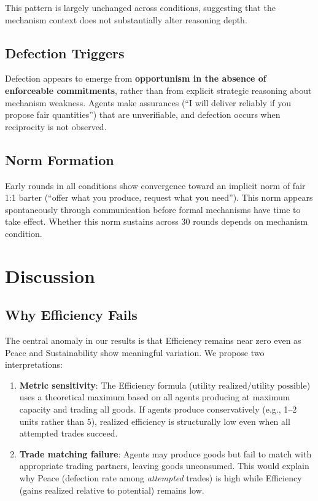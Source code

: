 \documentclass[12pt, a4paper]{article}
\begin{document}
This pattern is largely unchanged across conditions, suggesting that the mechanism context does not substantially alter reasoning depth.

\subsection{Defection Triggers}

Defection appears to emerge from \textbf{opportunism in the absence of enforceable commitments}, rather than from explicit strategic reasoning about mechanism weakness. Agents make assurances (``I will deliver reliably if you propose fair quantities'') that are unverifiable, and defection occurs when reciprocity is not observed.

\subsection{Norm Formation}

Early rounds in all conditions show convergence toward an implicit norm of fair 1:1 barter (``offer what you produce, request what you need''). This norm appears spontaneously through communication before formal mechanisms have time to take effect. Whether this norm sustains across 30 rounds depends on mechanism condition.

\section{Discussion}
\label{sec:discussion}

\subsection{Why Efficiency Fails}

The central anomaly in our results is that Efficiency remains near zero even as Peace and Sustainability show meaningful variation. We propose two interpretations:

\begin{enumerate}
  \item \textbf{Metric sensitivity}: The Efficiency formula ($\text{utility realized} / \text{utility possible}$) uses a theoretical maximum based on all agents producing at maximum capacity and trading all goods. If agents produce conservatively (e.g., 1--2 units rather than 5), realized efficiency is structurally low even when all attempted trades succeed.
  \item \textbf{Trade matching failure}: Agents may produce goods but fail to match with appropriate trading partners, leaving goods unconsumed. This would explain why Peace (defection rate among \textit{attempted} trades) is high while Efficiency (gains realized relative to potential) remains low.
\end{enumerate}
\end{document}
